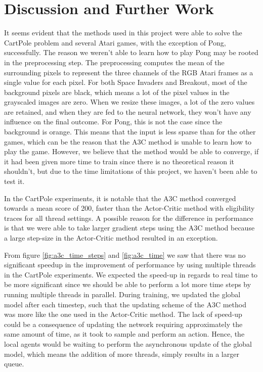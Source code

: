 \documentclass[11pt]{article}
\begin{document}
\section{Discussion and Further Work}

It seems evident that the methods used in this project were able
to solve the CartPole problem and several Atari games, with the exception of Pong, successfully.
The reason we weren't able to learn how to play Pong
may be rooted in the preprocessing step.
The preprocessing computes the mean of the surrounding pixels
to represent the three channels of the RGB Atari frames as a single
value for each pixel.
For both Space Invaders and Breakout, most of the background pixels are
black, which means a lot of the pixel values in the grayscaled images
are zero.
When we resize these images, a lot of the zero values are retained,
and when they are fed to the neural network, they won't have any
influence on the final outcome.
For Pong, this is not the case since the background is orange.
This means that the input is less sparse than for the other games,
which can be the reason that the A3C method is unable to learn
how to play the game.
However, we believe that the method would be able to converge, if
it had been given more time to train
since there is no theoretical reason it shouldn't,
but due to the time limitations
of this project, we haven't been able to test it.

In the CartPole experiments, it is notable that the A3C method converged
towards a mean score of 200, faster than the Actor-Critic method with
eligibility traces for all thread settings.
A possible reason for the difference in performance is that we were able to
take larger gradient steps using the A3C method
because a large step-size in the Actor-Critic method 
resulted in an exception.

From figure \ref{fig:a3c_time_steps} and \ref{fig:a3c_time} we saw 
that there was no significant speedup in the improvement of performance by
using multiple threads in the CartPole experiments.
We expected the speed-up in regards to real time to be more significant
since we should be able to perform a lot more time steps
by running multiple threads in parallel. 
During training, we updated the global model after each timestep,
such that the updating scheme of the A3C method was more like the one
used in the Actor-Critic method.
The lack of speed-up could be a consequence of updating the network requiring
approximately the same amount of time, as it took to sample and perform
an action.
Hence, the local agents would be waiting to
perform the asynchronous update of the global model, which means the addition of
more threads, simply results in a larger queue.
\end{document}

